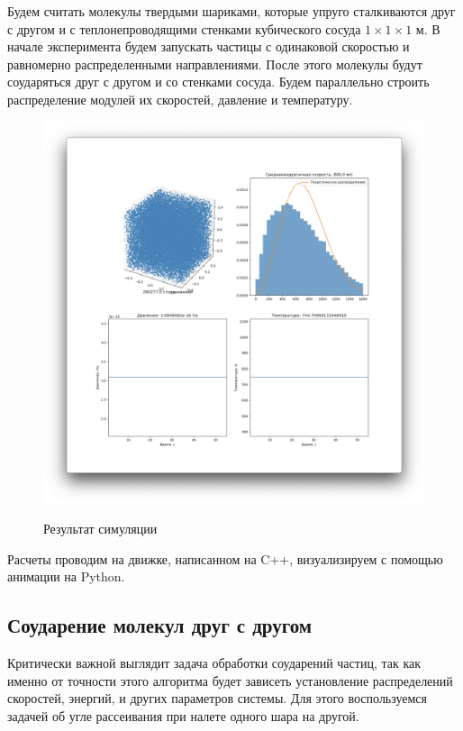\documentclass[twoside,twocolumn, 11pt]{article}
\theoremstyle{plain}
\theoremstyle{definition}
\begin{document}
\indent Будем считать молекулы твердыми шариками, которые упруго сталкиваются друг с другом и с теплонепроводящими стенками кубического сосуда $1 \times 1 \times 1$ м.
В начале эксперимента будем запускать частицы с одинаковой скоростью и равномерно распределенными направлениями. После этого молекулы будут
соударяться друг с другом и со стенками сосуда. Будем параллельно строить распределение модулей их скоростей, давление и температуру.
\begin{figure}[!h]
    {\includegraphics[width=1\linewidth]{ui.png}}
    \caption{Результат симуляции}
\end{figure}
Расчеты проводим на движке, написанном на C++, визуализируем с помощью анимации на Python.

\subsection{Соударение молекул друг с другом}
\indent Критически важной выглядит задача обработки соударений частиц, так как именно от точности этого алгоритма будет зависеть установление распределений скоростей, энергий, и других параметров системы.
Для этого воспользуемся задачей об угле рассеивания при налете одного шара на другой.
\end{document}
